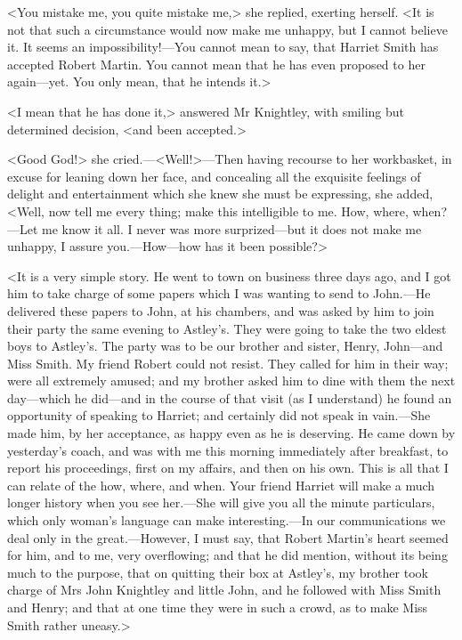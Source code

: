 <You mistake me, you quite mistake me,> she replied, exerting herself. <It is not that such a circumstance would now make me unhappy, but I cannot believe it. It seems an impossibility!—You cannot mean to say, that Harriet Smith has accepted Robert Martin. You cannot mean that he has even proposed to her again—yet. You only mean, that he intends it.>

<I mean that he has done it,> answered Mr Knightley, with smiling but determined decision, <and been accepted.>

<Good God!> she cried.—<Well!>—Then having recourse to her workbasket, in excuse for leaning down her face, and concealing all the exquisite feelings of delight and entertainment which she knew she must be expressing, she added, <Well, now tell me every thing; make this intelligible to me. How, where, when?—Let me know it all. I never was more surprized—but it does not make me unhappy, I assure you.—How—how has it been possible?>

<It is a very simple story. He went to town on business three days ago, and I got him to take charge of some papers which I was wanting to send to John.—He delivered these papers to John, at his chambers, and was asked by him to join their party the same evening to Astley's. They were going to take the two eldest boys to Astley's. The party was to be our brother and sister, Henry, John—and Miss Smith. My friend Robert could not resist. They called for him in their way; were all extremely amused; and my brother asked him to dine with them the next day—which he did—and in the course of that visit (as I understand) he found an opportunity of speaking to Harriet; and certainly did not speak in vain.—She made him, by her acceptance, as happy even as he is deserving. He came down by yesterday's coach, and was with me this morning immediately after breakfast, to report his proceedings, first on my affairs, and then on his own. This is all that I can relate of the how, where, and when. Your friend Harriet will make a much longer history when you see her.—She will give you all the minute particulars, which only woman's language can make interesting.—In our communications we deal only in the great.—However, I must say, that Robert Martin's heart seemed for him, and to me, very overflowing; and that he did mention, without its being much to the purpose, that on quitting their box at Astley's, my brother took charge of Mrs John Knightley and little John, and he followed with Miss Smith and Henry; and that at one time they were in such a crowd, as to make Miss Smith rather uneasy.>

